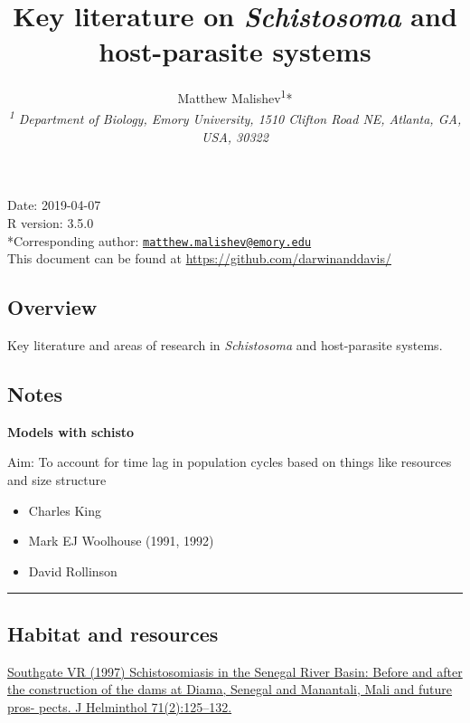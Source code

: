 \documentclass[10,portrait]{article}
\title{Key literature on \emph{Schistosoma} and host-parasite systems}
\author{Matthew
Malishev\textsuperscript{1}*\\[2\baselineskip]\emph{\textsuperscript{1}
Department of Biology, Emory University, 1510 Clifton Road NE, Atlanta,
GA, USA, 30322}}
\date{}
\providecommand{\tightlist}{%
  \setlength{\itemsep}{0pt}\setlength{\parskip}{0pt}}
\begin{document}
\maketitle

{
\hypersetup{linkcolor=black}
\setcounter{tocdepth}{3}
\tableofcontents
}
\newpage   

Date: 2019-04-07\\
R version: 3.5.0\\
*Corresponding author:
\href{mailto:matthew.malishev@emory.edu}{\nolinkurl{matthew.malishev@emory.edu}}\\
This document can be found at \url{https://github.com/darwinanddavis/}

\newpage  

\subsection{Overview}\label{overview}

Key literature and areas of research in \emph{Schistosoma} and
host-parasite systems.

\subsection{Notes}\label{notes}

\textbf{Models with schisto}

Aim: To account for time lag in population cycles based on things like
resources and size structure

\begin{itemize}
\tightlist
\item
  Charles King\\
\item
  Mark EJ Woolhouse (1991, 1992)\\
\item
  David Rollinson
\end{itemize}

\newpage  

\begin{center}\rule{0.5\linewidth}{\linethickness}\end{center}

\subsection{Habitat and resources}\label{habitat-and-resources}

\href{Southgate\%20VR\%20(1997)\%20Schistosomiasis\%20in\%20the\%20Senegal\%20River\%20Basin:\%20Before\%20and\%20after\%20the\%20construction\%20of\%20the\%20dams\%20at\%20Diama,\%20Senegal\%20and\%20Manantali,\%20Mali\%20and\%20future\%20pros-\%20pects.\%20J\%20Helminthol\%2071(2):125–132}{Southgate
VR (1997) Schistosomiasis in the Senegal River Basin: Before and after
the construction of the dams at Diama, Senegal and Manantali, Mali and
future pros- pects. J Helminthol 71(2):125--132.}
\end{document}
